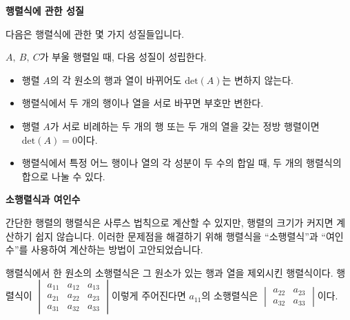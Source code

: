 \bigskip
\begin{flushleft}
    {\textcolor{subheader}{{\LARGE\textbf{행렬식에 관한 성질}}}}
\end{flushleft}


\begin{flushleft}
    다음은 행렬식에 관한 몇 가지 성질들입니다.
\end{flushleft}

\begin{tcolorbox}[colback = white, colframe = Theorem, title = \textmd{정리: 행렬식에 관한 몇 가지 성질}]
    $A, \ B, \ C$가 부울 행렬일 때, 다음 성질이 성립한다.
    \begin{itemize}
        \item 행렬 $A$의 각 원소의 행과 열이 바뀌어도 $\text{det}(A)$는 변하지 않는다.
        \item 행렬식에서 두 개의 행이나 열을 서로 바꾸면 부호만 변한다.
        \item 행렬 $A$가 서로 비례하는 두 개의 행 또는 두 개의 열을 갖는 정방 행렬이면 $\text{det}(A) = 0$이다.
        \item 행렬식에서 특정 어느 행이나 열의 각 성분이 두 수의 합일 때, 두 개의 행렬식의 합으로 나눌 수 있다.
    \end{itemize}
\end{tcolorbox}

\bigskip
\begin{flushleft}
    {\textcolor{subheader}{{\LARGE\textbf{소행렬식과 여인수}}}}
\end{flushleft}

\begin{flushleft}
    간단한 행렬의 행렬식은 사루스 법칙으로 계산할 수 있지만, 행렬의 크기가 커지면 계산하기 쉽지 않습니다. 
    이러한 문제점을 해결하기 위해 행렬식을 “소행렬식”과 “여인수”를 사용하여 계산하는 방법이 고안되었습니다.
\end{flushleft}

\begin{tcolorbox}[colback = white, colframe = Definition, title = \textmd{정의: 소행렬식}]
    행렬식에서 한 원소의 소행렬식은 그 원소가 있는 행과 열을 제외시킨 행렬식이다. 
행렬식이 $\begin{vmatrix} a_{11} & a_{12} & a_{13} \\ a_{21} & a_{22} & a_{23} \\ a_{31} & a_{32} & a_{33}
\end{vmatrix} $이렇게 주어진다면 $a_{11}$의 소행렬식은 $\begin{vmatrix}  a_{22} & a_{23} \\  a_{32} & a_{33}
\end{vmatrix} $이다.
\end{tcolorbox}

